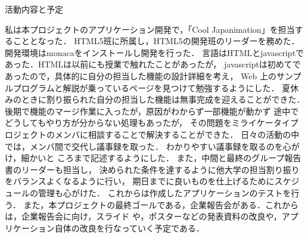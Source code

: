 \par 
活動内容と予定
\par
私は本プロジェクトのアプリケーション開発で，「Cool Japanimation」を担当することとなった．
HTML5班に所属し，HTML5の開発班のリーダーを務めた．
開発環境はmonacaをインストールし開発を行った．
言語はHTMLとjavascriptであった．HTMLは以前にも授業で触れたことがあったが，
javascriptは初めてであったので，具体的に自分の担当した機能の設計詳細を考え，
Web 上のサンプルプログラムと解説が乗っているページを見つけて勉強するようにした．
夏休みのときに割り振られた自分の担当した機能は無事完成を迎えることができた．
後期で機能のマージ作業に入ったが，原因がわからず一部機能が動かず
途中でどうしてもやり方が分からない処理もあったが，
その問題をミライケータイプロジェクトのメンバに相談することで解決することができた．
日々の活動の中では，メンバ間で交代し議事録を取った．
わかりやすい議事録を取るのを心がけ，細かいと
ころまで記述するようにした．
また，中間と最終のグループ報告書のリーダーも担当し，
決められた条件を達するように他大学の担当割り振りをバランスよくなるように行い，
期日までに良いものを仕上げるためにスケジュールの管理も心がけた．
これからは作成したアプリケーションのテストを行う．
また，本プロジェクトの最終ゴールである，企業報告会がある．これからは，企業報告会に向け，スライド
や，ポスターなどの発表資料の改良や，アプリケーション自体の改良を行なっていく予定である．
